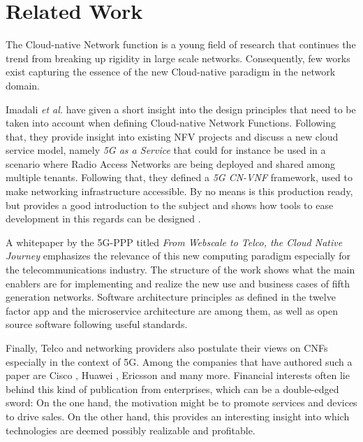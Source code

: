 \section{Related Work}
The Cloud-native Network function is a young field of research that continues the trend from breaking up rigidity in large scale networks. Consequently, few works exist capturing the essence of the new Cloud-native paradigm in the network domain.

Imadali \textit{et al.} have given a short insight into the design principles that need to be taken into account when defining Cloud-native Network Functions. Following that, they provide insight into existing NFV projects and discuss a new cloud service model, namely \textit{5G as a Service} that could for instance be used in a scenario where Radio Access Networks are being deployed and shared among multiple tenants. Following that, they defined a \textit{5G CN-VNF} framework, used to make networking infrastructure accessible. By no means is this production ready, but provides a good introduction to the subject and shows how tools to ease development in this regards can be designed \cite{cn5gvnf}.

A whitepaper by the 5G-PPP titled \textit{From Webscale to Telco, the Cloud Native Journey} \cite{5gppp} emphasizes the relevance of this new computing paradigm especially for the telecommunications industry. The structure of the work shows what the main enablers are for implementing and realize the new use and business cases of fifth generation networks. Software architecture principles as defined in the twelve factor app and the microservice architecture are among them, as well as open source software following useful standards.

Finally, Telco and networking providers also postulate their views on CNFs especially in the context of 5G. Among the companies that have authored such a paper are Cisco \cite{CNF}, Huawei \cite{evolutionnfv}, Ericsson \cite{ericsson} and many more. Financial interests often lie behind this kind of publication from enterprises, which can be a double-edged sword: On the one hand, the motivation might be to promote services and devices to drive sales. On the other hand, this provides an interesting insight into which technologies are deemed possibly realizable and profitable.